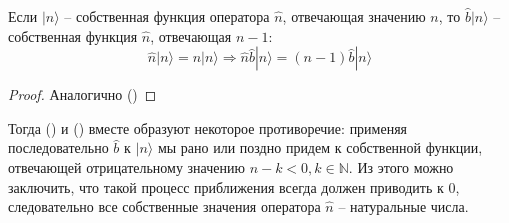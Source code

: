 \begin{theorem}
Если $|n\rangle$ -- собственная функция оператора $\hat{n}$, отвечающая значению $n$, то $\hat{b}|n\rangle$ -- собственная функция $\hat{n}$, отвечающая $n-1$:
$$
\hat{n}|n\rangle=n|n\rangle\Longrightarrow\hat{n}\hat{b}|n\rangle=(n-1)\hat{b}|n\rangle
$$
\end{theorem}
\begin{proof}
Аналогично ()
\end{proof}
Тогда () и () вместе образуют некоторое противоречие: применяя последовательно $\hat{b}$ к $|n\rangle$ мы рано или поздно придем к собственной функции, отвечающей отрицательному значению $n-k<0,k\in\mathbb{N}$. Из этого можно заключить, что такой процесс приближения всегда должен приводить к $0$, следовательно все собственные значения оператора $\hat{n}$ -- натуральные числа.

